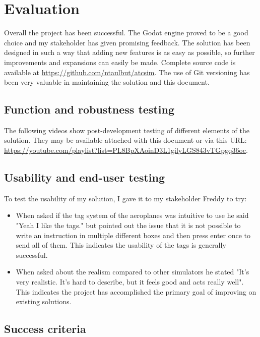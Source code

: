 \documentclass{article}
\begin{document}
\clearpage
\section{Evaluation}
Overall the project has been successful.
The Godot engine proved to be a good choice and my stakeholder has given promising feedback.
The solution has been designed in such a way that adding new features is as easy as possible, so further improvements and expansions can easily be made.
Complete source code is available at \url{https://github.com/ntaulbut/atcsim}.
The use of Git versioning has been very valuable in maintaining the solution and this document.

\subsection{Function and robustness testing}
The following videos show post-development testing of different elements of the solution.
They may be available attached with this document or via this URL: \url{https://youtube.com/playlist?list=PL8BpXAoinD3L1gilyLGS843vTGpgq36oc}.


\subsection{Usability and end-user testing}
To test the usability of my solution, I gave it to my stakeholder Freddy to try:
\begin{itemize}
    \item When asked if the tag system of the aeroplanes was intuitive to use he said "Yeah I like the tags." but pointed out the issue that it is not possible to write an instruction in multiple different boxes and then press enter once to send all of them.
    This indicates the usability of the tags is generally successful.
    \item When asked about the realism compared to other simulators he stated "It's very realistic. It's hard to describe, but it feels good and acts really well".
    This indicates the project has accomplished the primary goal of improving on existing solutions.
\end{itemize}


\subsection{Success criteria}
\end{document}
